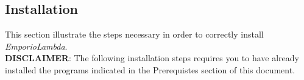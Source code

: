\subsection{Installation}
This section illustrate the steps necessary in order to correctly install \textit{EmporioLambda}.\\
\textbf{DISCLAIMER}: The following installation steps requires you to have already installed the programs indicated in the Prerequistes section of this document.



